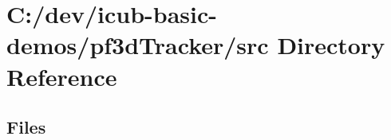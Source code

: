 \section{C\+:/dev/icub-\/basic-\/demos/pf3d\+Tracker/src Directory Reference}
\label{dir_e598492b3e513106f2ee79440d3c69e6}
\subsection*{Files}
\begin{DoxyCompactItemize}
\end{DoxyCompactItemize}

